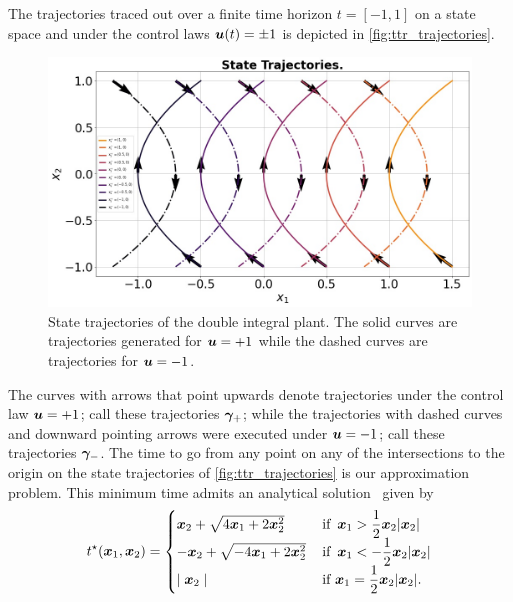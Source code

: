 The trajectories traced out over a finite time horizon $t=[-1, 1]$ on a state space and under the control laws $\bm{u}(t) = \pm 1$ is depicted in \autoref{fig:ttr_trajectories}. 
\begin{figure}[tb!]
	\centering
	\includegraphics[width=\columnwidth]{figures/doub_int_trajos.jpg}
	\caption{State trajectories of the double integral plant. The solid curves are trajectories generated for $\bm{u}=+1$ while the dashed curves are trajectories for $\bm{u} = -1$.}
	\label{fig:ttr_trajectories}
\end{figure}
%
The curves with arrows that point upwards denote trajectories under the control law  $\bm{u}=+1$; call these trajectories $\bm{\gamma}_+$; while the  trajectories with dashed curves and downward pointing arrows were executed under $\bm{u}=-1$; call these trajectories $\bm{\gamma}_-$. The time to go from any point on any of the intersections to the origin on the state trajectories of \autoref{fig:ttr_trajectories} is our approximation problem.  This minimum time admits an analytical solution~\cite{AthansFalb} given by
%
\begin{align}
	t^\star(\state_1, \state_2) = %
	\begin{cases}
		\state_2 + \sqrt{4 \state_1 + 2 \state_2^2} \, &\text{if } \, \state_1 > \dfrac{1}{2} \state_2 |\state_2| \\
		-\state_2 + \sqrt{-4 \state_1 + 2 \state_2^2} \, &\text{if }  \, \state_1 < -\dfrac{1}{2} \state_2 |\state_2| \\
		\mid \state_2 \mid &\text{if } \state_1 = \dfrac{1}{2} \state_2 |\state_2|.
	\end{cases}
\end{align}


